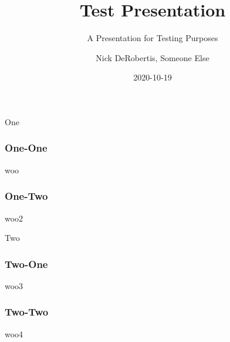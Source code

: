 \documentclass[15pt]{beamer}
\institute[UF \& VCU]{\inst{1}
University of Florida\\
Line two
\and
\inst{2}
Virginia Commonwealth University}
\begin{document}
\title[Pres]{Test Presentation}
\subtitle{A Presentation for Testing Purposes}
\author[People]{Nick DeRobertis, Someone Else}
\date{2020-10-19}
\begin{frame}
\titlepage
\label{title-frame}
\end{frame}
\begin{section}{One}
\begin{frame}
\frametitle{One-One}
woo
\end{frame}
\begin{frame}
\frametitle{One-Two}
woo2
\end{frame}
\end{section}
\begin{section}{Two}
\begin{frame}
\frametitle{Two-One}
woo3
\end{frame}
\begin{frame}
\frametitle{Two-Two}
woo4
\end{frame}
\end{section}
\end{document}
